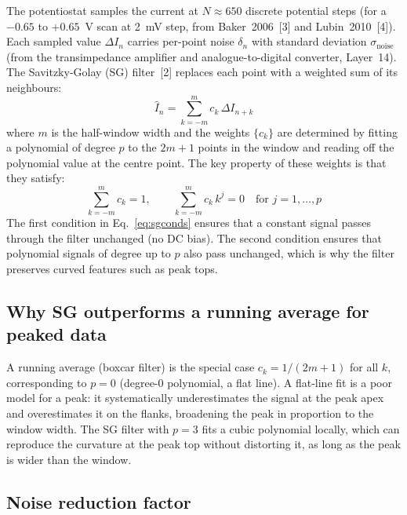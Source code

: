 \documentclass[10pt,a4paper]{article}
\numberwithin{equation}{section}
\newcommand{\cit}[1]{[#1]}
\newcommand{\DI}{\Delta I}
\begin{document}
The potentiostat samples the current at $N \approx 650$ discrete potential
steps (for a $-0.65$ to $+0.65$~V scan at 2~mV step, from Baker~2006~\cit{3}
and Lubin~2010~\cit{4}). Each sampled value $\DI_n$ carries per-point noise
$\delta_n$ with standard deviation $\sigma_\text{noise}$ (from the
transimpedance amplifier and analogue-to-digital converter, Layer~14).
The Savitzky-Golay (SG) filter~\cit{2} replaces each point with a
weighted sum of its neighbours:
\begin{equation}
  \hat{I}_n = \sum_{k=-m}^{m} c_k\, \DI_{n+k}
  \label{eq:sg}
\end{equation}
where $m$ is the half-window width and the weights $\{c_k\}$ are
determined by fitting a polynomial of degree $p$ to the $2m+1$
points in the window and reading off the polynomial value at the
centre point. The key property of these weights is that they satisfy:
\begin{equation}
  \sum_{k=-m}^{m} c_k = 1, \qquad
  \sum_{k=-m}^{m} c_k\, k^j = 0 \quad \text{for } j = 1, \ldots, p
  \label{eq:sgconds}
\end{equation}
The first condition in Eq.~\eqref{eq:sgconds} ensures that a constant signal
passes through the filter unchanged (no DC bias). The second condition
ensures that polynomial signals of degree up to $p$ also pass unchanged,
which is why the filter preserves curved features such as peak tops.

\subsection{Why SG outperforms a running average for peaked data}

A running average (boxcar filter) is the special case $c_k = 1/(2m+1)$
for all $k$, corresponding to $p = 0$ (degree-0 polynomial, a flat line).
A flat-line fit is a poor model for a peak: it systematically
underestimates the signal at the peak apex and overestimates it on the
flanks, broadening the peak in proportion to the window width.
The SG filter with $p = 3$ fits a cubic polynomial locally, which can
reproduce the curvature at the peak top without distorting it, as long
as the peak is wider than the window.

\subsection{Noise reduction factor}
\end{document}
